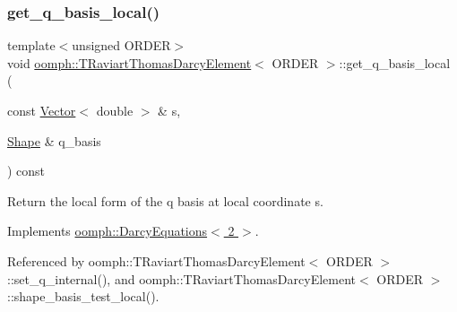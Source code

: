 \mbox{\label{classoomph_1_1TRaviartThomasDarcyElement_a16c5506831abea90f801a4db7022d6a3}} 
\subsubsection{\texorpdfstring{get\+\_\+q\+\_\+basis\+\_\+local()}{get\_q\_basis\_local()}\hspace{0.1cm}{\footnotesize\ttfamily [2/3]}}
{\footnotesize\ttfamily template$<$unsigned O\+R\+D\+ER$>$ \\
void \hyperlink{classoomph_1_1TRaviartThomasDarcyElement}{oomph\+::\+T\+Raviart\+Thomas\+Darcy\+Element}$<$ O\+R\+D\+ER $>$\+::get\+\_\+q\+\_\+basis\+\_\+local (\begin{DoxyParamCaption}\item[{const \hyperlink{classoomph_1_1Vector}{Vector}$<$ double $>$ \&}]{s,  }\item[{\hyperlink{classoomph_1_1Shape}{Shape} \&}]{q\+\_\+basis }\end{DoxyParamCaption}) const\hspace{0.3cm}{\ttfamily [virtual]}}



Return the local form of the q basis at local coordinate s. 



Implements \hyperlink{classoomph_1_1DarcyEquations_ae4098060d7311ceab8ad7673876f070c}{oomph\+::\+Darcy\+Equations$<$ 2 $>$}.



Referenced by oomph\+::\+T\+Raviart\+Thomas\+Darcy\+Element$<$ O\+R\+D\+E\+R $>$\+::set\+\_\+q\+\_\+internal(), and oomph\+::\+T\+Raviart\+Thomas\+Darcy\+Element$<$ O\+R\+D\+E\+R $>$\+::shape\+\_\+basis\+\_\+test\+\_\+local().

\mbox{\label{classoomph_1_1TRaviartThomasDarcyElement_a06df8d098318e1ef45259e2f65ed35be}} 
